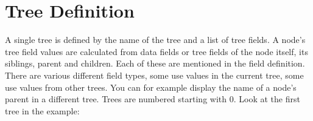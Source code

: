 \documentclass[letterpaper,10pt,english]{sphinxmanual}
\begin{document}
\begin{sphinxVerbatim}[commandchars=\\\{\}]
 
         
     \PYG{p}{[}\PYG{p}{[}  \PYG{p}{]} \PYG{p}{[}\PYG{p}{]}\PYG{p}{]}

 
         
     \PYG{p}{[}\PYG{p}{[}  \PYG{p}{]} \PYG{p}{[} \PYG{p}{]}\PYG{p}{]}
\end{sphinxVerbatim}


\section{Tree Definition}
\label{\detokenize{data-format:tree-definition}}
\sphinxAtStartPar
A single tree is defined by the name of the tree and a list of tree fields. A node’s tree field values are calculated from data fields or tree fields of the node itself, its siblings, parent and children. Each of these are mentioned in the field definition. There are various different field types, some use values in the current tree, some use values from other trees. You can for example display the name of a node’s parent in a different tree. Trees are numbered starting with 0. Look at the first tree in the example:
\end{document}
